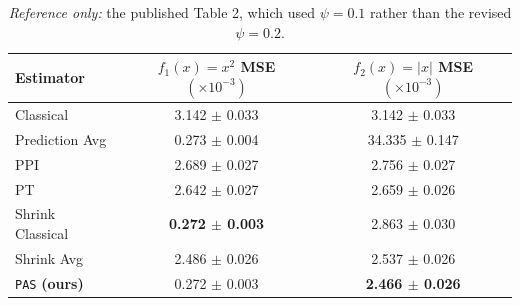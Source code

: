 \begin{table}[H]
    \centering
    \caption{\emph{Reference only:} the published Table 2, which used $\psi=0.1$ rather than the revised $\psi=0.2$.}
    \label{tbl:published_synthetic}
    \vskip 0.05in
    \footnotesize
    \begin{tabular}{lcc}
    \toprule
    \textbf{Estimator} & \textbf{$f_1(x) = x^2$} \textbf{MSE} \( (\times 10^{-3}) \) & \textbf{$f_2(x) = |x|$} \textbf{MSE} \( (\times 10^{-3}) \) \\
    \midrule
    Classical & 3.142 $\pm$ 0.033 & 3.142 $\pm$ 0.033 \\
    Prediction Avg & 0.273 $\pm$ 0.004 & 34.335 $\pm$ 0.147 \\
    PPI & 2.689 $\pm$ 0.027 & 2.756 $\pm$ 0.027 \\
    PT & 2.642 $\pm$ 0.027 & 2.659 $\pm$ 0.026 \\
    Shrink Classical & \textbf{0.272 $\pm$ 0.003} & 2.863 $\pm$ 0.030 \\
    Shrink Avg & 2.486 $\pm$ 0.026 & 2.537 $\pm$ 0.026 \\
    \texttt{PAS} \textbf{(ours)} & 0.272 $\pm$ 0.003 & \textbf{2.466 $\pm$ 0.026} \\
    \bottomrule
    \end{tabular}
\end{table}
